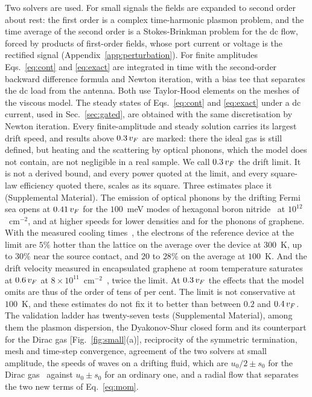 Two solvers are used. For small signals the fields are expanded to second
order about rest: the first order is a complex time-harmonic plasmon problem,
and the time average of the second order is a Stokes-Brinkman problem for the
dc flow, forced by products of first-order fields, whose port current or
voltage is the rectified signal (Appendix~\ref{app:perturbation}). For finite amplitudes
Eqs.~\eqref{eq:cont} and \eqref{eq:exact} are integrated in time with the
second-order backward difference formula and Newton iteration, with a bias
tee that separates the dc load from the antenna. Both use Taylor-Hood
elements on the meshes of the viscous model. The steady states of
Eqs.~\eqref{eq:cont} and \eqref{eq:exact} under a dc current, used in
Sec.~\ref{sec:gated}, are obtained with the same discretisation by Newton
iteration. Every finite-amplitude and steady solution carries its largest
drift speed, and results above $0.3\,v_{F}$ are marked: there the ideal gas
is still defined, but heating and the scattering by optical phonons,
which the model does not contain, are not negligible in a real sample.
We call $0.3\,v_{F}$ the drift limit. It is not a derived bound, and every
power quoted at the limit, and every square-law efficiency quoted there,
scales as its square. Three estimates place it (Supplemental Material).
The emission of optical phonons by the drifting Fermi sea opens at
$0.41\,v_{F}$ for the $100$~meV modes of hexagonal boron
nitride~\cite{tielrooij2018out} at $10^{12}$~cm$^{-2}$, and at higher
speeds for lower densities and for the phonons of graphene. With the
measured cooling times~\cite{tielrooij2018out}, the electrons of the
reference device at the limit are $5\%$ hotter than the lattice on the
average over the device at $300$~K, up to $30\%$ near the source
contact, and $20$ to $28\%$ on the average at $100$~K. And the drift
velocity measured in encapsulated graphene at room temperature saturates
at $0.6\,v_{F}$ at $8\times10^{11}$~cm$^{-2}$~\cite{yamoah2017high}, twice
the limit. At $0.3\,v_{F}$ the effects that the model omits are thus of
the order of tens of per cent. The limit is not conservative at
$100$~K, and these estimates do not fix it to better than between $0.2$
and $0.4\,v_{F}$.
The validation ladder has twenty-seven tests (Supplemental Material),
among them the plasmon
dispersion, the Dyakonov-Shur closed form and its counterpart for the
Dirac gas [Fig.~\ref{fig:small}(a)],
reciprocity of the symmetric termination, mesh and time-step convergence,
agreement of the two solvers at small amplitude,
the speeds of waves on a drifting fluid, which are $u_{0}/2\pm s_{0}$ for
the Dirac gas~\cite{svintsov2013hydrodynamic} against $u_{0}\pm s_{0}$ for
an ordinary one, and a radial flow that separates the two new terms of
Eq.~\eqref{eq:mom}.

